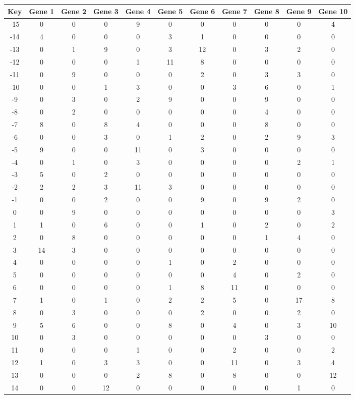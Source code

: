 \begin{tabular}{|c|c|c|c|c|c|c|c|c|c|c|}
\hline
Key & Gene 1 & Gene 2 & Gene 3 & Gene 4 & Gene 5 & Gene 6 & Gene 7 & Gene 8 & Gene 9 & Gene 10 \\
\hline
-15 & 0 & 0 & 0 & 9 & 0 & 0 & 0 & 0 & 0 & 4 \\
-14 & 4 & 0 & 0 & 0 & 3 & 1 & 0 & 0 & 0 & 0 \\
-13 & 0 & 1 & 9 & 0 & 3 & 12 & 0 & 3 & 2 & 0 \\
-12 & 0 & 0 & 0 & 1 & 11 & 8 & 0 & 0 & 0 & 0 \\
-11 & 0 & 9 & 0 & 0 & 0 & 2 & 0 & 3 & 3 & 0 \\
-10 & 0 & 0 & 1 & 3 & 0 & 0 & 3 & 6 & 0 & 1 \\
-9 & 0 & 3 & 0 & 2 & 9 & 0 & 0 & 9 & 0 & 0 \\
-8 & 0 & 2 & 0 & 0 & 0 & 0 & 0 & 4 & 0 & 0 \\
-7 & 8 & 0 & 8 & 4 & 0 & 0 & 0 & 8 & 0 & 0 \\
-6 & 0 & 0 & 3 & 0 & 1 & 2 & 0 & 2 & 9 & 3 \\
-5 & 9 & 0 & 0 & 11 & 0 & 3 & 0 & 0 & 0 & 0 \\
-4 & 0 & 1 & 0 & 3 & 0 & 0 & 0 & 0 & 2 & 1 \\
-3 & 5 & 0 & 2 & 0 & 0 & 0 & 0 & 0 & 0 & 0 \\
-2 & 2 & 2 & 3 & 11 & 3 & 0 & 0 & 0 & 0 & 0 \\
-1 & 0 & 0 & 2 & 0 & 0 & 9 & 0 & 9 & 2 & 0 \\
0 & 0 & 9 & 0 & 0 & 0 & 0 & 0 & 0 & 0 & 3 \\
1 & 1 & 0 & 6 & 0 & 0 & 1 & 0 & 2 & 0 & 2 \\
2 & 0 & 8 & 0 & 0 & 0 & 0 & 0 & 1 & 4 & 0 \\
3 & 14 & 3 & 0 & 0 & 0 & 0 & 0 & 0 & 0 & 0 \\
4 & 0 & 0 & 0 & 0 & 1 & 0 & 2 & 0 & 0 & 0 \\
5 & 0 & 0 & 0 & 0 & 0 & 0 & 4 & 0 & 2 & 0 \\
6 & 0 & 0 & 0 & 0 & 1 & 8 & 11 & 0 & 0 & 0 \\
7 & 1 & 0 & 1 & 0 & 2 & 2 & 5 & 0 & 17 & 8 \\
8 & 0 & 3 & 0 & 0 & 0 & 2 & 0 & 0 & 2 & 0 \\
9 & 5 & 6 & 0 & 0 & 8 & 0 & 4 & 0 & 3 & 10 \\
10 & 0 & 3 & 0 & 0 & 0 & 0 & 0 & 3 & 0 & 0 \\
11 & 0 & 0 & 0 & 1 & 0 & 0 & 2 & 0 & 0 & 2 \\
12 & 1 & 0 & 3 & 3 & 0 & 0 & 11 & 0 & 3 & 4 \\
13 & 0 & 0 & 0 & 2 & 8 & 0 & 8 & 0 & 0 & 12 \\
14 & 0 & 0 & 12 & 0 & 0 & 0 & 0 & 0 & 1 & 0 \\
\hline
\end{tabular}